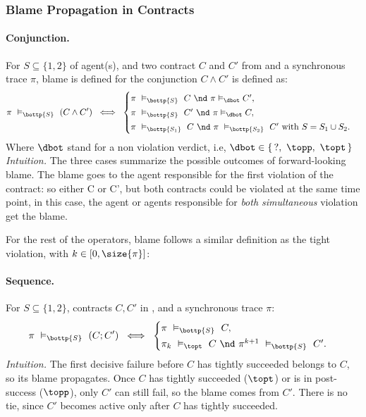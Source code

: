 \subsubsection*{Blame Propagation in Contracts}
\paragraph{Conjunction.}
For $S \subseteq\{1, 2\}$ of agent(s), and  two contract $C$ and $C'$ from \cDL and a synchronous trace $\pi$, blame is defined for the conjunction $C \wedge C'$ is defined as:
\[
\pi\ \vDash_{\bottp{S}}\ (C\wedge C') \;\iff\;
\begin{cases}
\pi\ \vDash_{\bottp{S}}\ C \ \nd\ \pi \vDash_{\dbot} C',\\[2pt]
\pi\ \vDash_{\bottp{S}}\ C' \ \nd\ \pi \vDash_{\dbot} C,\\[2pt]
\pi\ \vDash_{\bottp{S_1}}\ C\ \nd\ \pi\ \vDash_{\bottp{S_2}}\ C' \text{ with } S=S_1\cup S_2.
\end{cases}
\]
Where $\dbot$ stand for a non violation verdict, i.e, $\dbot \in \{\,?,\ \topp,\ \topt\,\}$\\
\emph{Intuition.}
The three cases summarize the possible outcomes of forward-looking blame.
The blame goes to the agent responsible for the first violation of the contract: so either C or C', but both contracts could be violated at the same time point, in this case, the agent or agents responsible for \emph{both simultaneous} violation get the blame.

For the rest of the operators,  blame  follows a similar definition as the tight violation, with $k \in [0, \size{\pi}]$:

\paragraph{Sequence.}
For \(S\subseteq\{1,2\}\), contracts \(C,C'\) in \cDL, and a synchronous trace \(\pi\):
\[
\pi\ \vDash_{\bottp{S}}\ (C;C') \;\iff\;
\begin{cases}
\pi\ \vDash_{\bottp{S}}\ C,\\[2pt]
\pi_k\ \vDash_{\topt} \ C \ \nd\ \pi^{k+1}\ \vDash_{\bottp{S}}\ C'.
\end{cases}
\]
\emph{Intuition.} The first decisive failure before \(C\) has tightly succeeded belongs to \(C\), so its blame propagates. Once \(C\) has tightly succeeded (\(\topt\)) or is in post-success (\(\topp\)), only \(C'\) can still fail, so the blame comes from \(C'\). There is no tie, since \(C'\) becomes active only after \(C\) has tightly succeeded.

